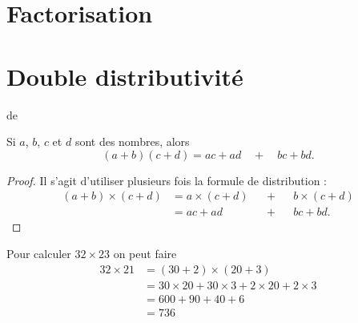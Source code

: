\section{Factorisation}



\section{Double distributivité}






de \cite{ZGRKooSUSPix}

\begin{propriete}
    Si \( a\), \( b\), \( c\) et \( d\) sont des nombres, alors
    \begin{equation}
        (a+b)(c+d)=ac+ad\quad+\quad bc+bd.
    \end{equation}
\end{propriete}

\begin{proof}
    Il s'agit d'utiliser plusieurs fois la formule de distribution :
    \begin{subequations}
        \begin{align}
            (a+b)\times \boxed{(c+d)}&=a\times \boxed{(c+d)}&&+&& b\times \boxed{(c+d)}\\
            &=ac+ad  &&+&&bc+bd.
        \end{align}
    \end{subequations}
\end{proof}

\begin{example}
    Pour calculer \( 32\times 23 \) on peut faire
    \begin{subequations}
        \begin{align}
                32\times 21&=(30+2)\times (20+3)\\
                &=30\times 20+30\times 3+2\times 20+2\times 3\\
                &=600+90+40+6\\
                &=736
        \end{align}
    \end{subequations}
\end{example}



